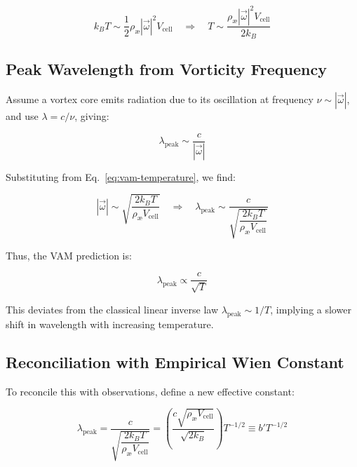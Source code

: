 \begin{equation}
k_B T \sim \frac{1}{2} \rho_\text{\ae} |\vec{\omega}|^2 V_{\text{cell}}
\quad \Rightarrow \quad
T \sim \frac{\rho_\text{\ae} |\vec{\omega}|^2 V_{\text{cell}}}{2 k_B}
\label{eq:vam-temperature}
\end{equation}

\subsection{Peak Wavelength from Vorticity Frequency}

Assume a vortex core emits radiation due to its oscillation at frequency \( \nu \sim |\vec{\omega}| \), and use \( \lambda = c/\nu \), giving:

\begin{equation}
\lambda_{\text{peak}} \sim \frac{c}{|\vec{\omega}|}
\end{equation}

Substituting from Eq.~\eqref{eq:vam-temperature}, we find:

\begin{equation}
|\vec{\omega}| \sim \sqrt{ \frac{2 k_B T}{\rho_\text{\ae} V_{\text{cell}}} }
\quad \Rightarrow \quad
\boxed{
\lambda_{\text{peak}} \sim \frac{c}{\sqrt{ \dfrac{2 k_B T}{\rho_\text{\ae} V_{\text{cell}}} }}
}
\label{eq:vam-lambda}
\end{equation}

Thus, the VAM prediction is:

\begin{equation}
\boxed{
\lambda_{\text{peak}} \propto \frac{c}{\sqrt{T}}
}
\end{equation}

This deviates from the classical linear inverse law \( \lambda_{\text{peak}} \sim 1/T \), implying a slower shift in wavelength with increasing temperature.

\subsection{Reconciliation with Empirical Wien Constant}

To reconcile this with observations, define a new effective constant:

\begin{equation}
\lambda_{\text{peak}} = \frac{c}{\sqrt{ \dfrac{2 k_B T}{\rho_\text{\ae} V_{\text{cell}}} }} 
= \left( \frac{c \sqrt{\rho_\text{\ae} V_{\text{cell}}}}{\sqrt{2 k_B}} \right) T^{-1/2}
\equiv b' T^{-1/2}
\end{equation}

